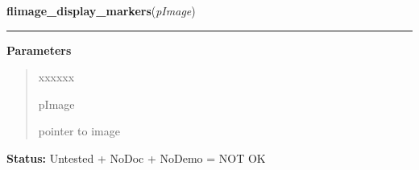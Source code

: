 \hspace{.8\funcindent}\begin{boxedminipage}{\funcwidth}

    \raggedright \textbf{flimage\_display\_markers}(\textit{pImage})

    \vspace{-1.5ex}

    \rule{\textwidth}{0.5\fboxrule}
\setlength{\parskip}{2ex}
\setlength{\parskip}{1ex}
      \textbf{Parameters}
      \vspace{-1ex}

      \begin{quote}
        \begin{Ventry}{xxxxxx}

          \item[pImage]

          pointer to image

        \end{Ventry}

      \end{quote}

\textbf{Status:} Untested + NoDoc + NoDemo = NOT OK



    \end{boxedminipage}

    \label{xformslib:library:flimage_dup_}

    \vspace{0.5ex}

